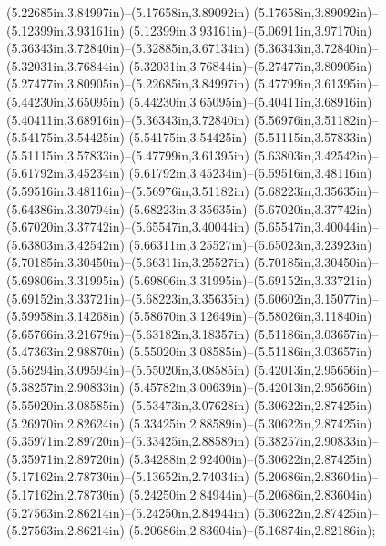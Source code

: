 (5.22685in,3.84997in)--(5.17658in,3.89092in) (5.17658in,3.89092in)--(5.12399in,3.93161in) (5.12399in,3.93161in)--(5.06911in,3.97170in) (5.36343in,3.72840in)--(5.32885in,3.67134in) (5.36343in,3.72840in)--(5.32031in,3.76844in) (5.32031in,3.76844in)--(5.27477in,3.80905in) (5.27477in,3.80905in)--(5.22685in,3.84997in) (5.47799in,3.61395in)--(5.44230in,3.65095in) (5.44230in,3.65095in)--(5.40411in,3.68916in) (5.40411in,3.68916in)--(5.36343in,3.72840in) (5.56976in,3.51182in)--(5.54175in,3.54425in) (5.54175in,3.54425in)--(5.51115in,3.57833in) (5.51115in,3.57833in)--(5.47799in,3.61395in) (5.63803in,3.42542in)--(5.61792in,3.45234in) (5.61792in,3.45234in)--(5.59516in,3.48116in) (5.59516in,3.48116in)--(5.56976in,3.51182in) (5.68223in,3.35635in)--(5.64386in,3.30794in) (5.68223in,3.35635in)--(5.67020in,3.37742in) (5.67020in,3.37742in)--(5.65547in,3.40044in) (5.65547in,3.40044in)--(5.63803in,3.42542in) (5.66311in,3.25527in)--(5.65023in,3.23923in) (5.70185in,3.30450in)--(5.66311in,3.25527in) (5.70185in,3.30450in)--(5.69806in,3.31995in) (5.69806in,3.31995in)--(5.69152in,3.33721in) (5.69152in,3.33721in)--(5.68223in,3.35635in) (5.60602in,3.15077in)--(5.59958in,3.14268in) (5.58670in,3.12649in)--(5.58026in,3.11840in) (5.65766in,3.21679in)--(5.63182in,3.18357in) (5.51186in,3.03657in)--(5.47363in,2.98870in) (5.55020in,3.08585in)--(5.51186in,3.03657in) (5.56294in,3.09594in)--(5.55020in,3.08585in) (5.42013in,2.95656in)--(5.38257in,2.90833in) (5.45782in,3.00639in)--(5.42013in,2.95656in) (5.55020in,3.08585in)--(5.53473in,3.07628in) (5.30622in,2.87425in)--(5.26970in,2.82624in) (5.33425in,2.88589in)--(5.30622in,2.87425in) (5.35971in,2.89720in)--(5.33425in,2.88589in) (5.38257in,2.90833in)--(5.35971in,2.89720in) (5.34288in,2.92400in)--(5.30622in,2.87425in) (5.17162in,2.78730in)--(5.13652in,2.74034in) (5.20686in,2.83604in)--(5.17162in,2.78730in) (5.24250in,2.84944in)--(5.20686in,2.83604in) (5.27563in,2.86214in)--(5.24250in,2.84944in) (5.30622in,2.87425in)--(5.27563in,2.86214in) (5.20686in,2.83604in)--(5.16874in,2.82186in);
